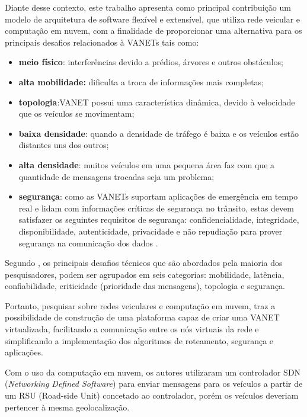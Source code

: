 \documentclass[
	12pt,				%
	oneside,			%
	a4paper,			%
	english,			%
	brazil				%
	]{abntex2ppgsi}
\begin{document}
Diante desse contexto, este trabalho apresenta como principal contribuição um modelo de arquitetura de software flexível e extensível, que utiliza rede veicular  e  computação em nuvem, com a finalidade de proporcionar uma alternativa para os principais desafios relacionados à VANETs tais como: 

\begin{itemize}
	\item{\textbf{meio físico}: interferências devido a prédios,  árvores e outros obstáculos;}
	\item{\textbf{alta mobilidade:} dificulta a troca de informações mais completas; }
	\item{\textbf{topologia}:VANET possui uma característica dinâmica, devido à velocidade que os veículos se movimentam;}	
	\item{\textbf{baixa densidade}: quando a densidade de tráfego é baixa e os veículos estão distantes uns dos outros;}
	\item{\textbf{alta densidade}: muitos veículos em uma pequena área faz com que a quantidade de mensagens trocadas seja um problema;}
	\item{\textbf{segurança}: como as VANETs suportam aplicações de emergência em tempo real e lidam com informações	críticas de segurança no trânsito, estas devem satisfazer os seguintes requisitos de segurança: confidencialidade, integridade, disponibilidade, autenticidade, privacidade e não repudiação para prover segurança na comunicação dos dados \cite{samara2010security} \cite{matos2013analise}.}
\end{itemize} 

Segundo , os principais desafios técnicos que são abordados pela maioria dos pesquisadores, podem ser agrupados em seis categorias: mobilidade, latência, confiabilidade, criticidade (prioridade das mensagens), topologia e segurança. 

Portanto, pesquisar sobre redes veiculares e computação em nuvem, traz a possibilidade de construção de uma plataforma capaz de criar uma VANET virtualizada, facilitando a comunicação entre os nós virtuais da rede e simplificando a implementação dos algoritmos de roteamento, segurança e aplicações.

Com o uso da computação em nuvem, os autores   utilizaram um controlador SDN (\textit{Networking Defined Software}) para enviar mensagens para os veículos a partir de um RSU (Road-side Unit) concetado ao controlador, porém os veículos deveriam pertencer à mesma geolocalização.
\end{document}
